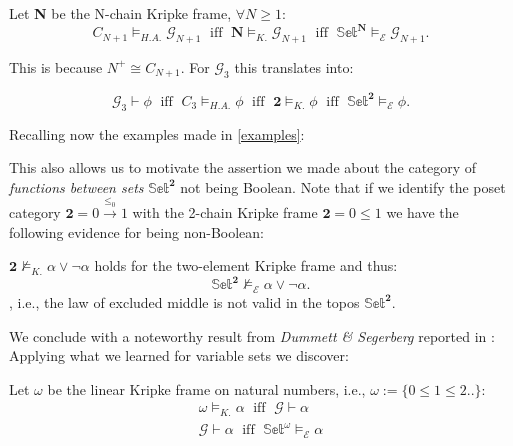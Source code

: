 \begin{prop}
	Let \textbf{N} be the N-chain Kripke frame,
	$\forall N \geq 1$:
	\begin{equation*}
		C_{N+1} \models_{H.A.} \mathcal{G}_{N+1} \; \text{ iff } \; \textbf{N} \models_{K.} \mathcal{G}_{N+1}
		\; \text{ iff } \; \mathbb{Set}^\textbf{N} \models_{\mathcal{E}} \mathcal{G}_{N+1}.
	\end{equation*}
\end{prop}

 This is because $N^+ \cong C_{N+1}$.
\newline
For $\mathcal{G}_3$ this translates into:
\begin{cor}
	\begin{equation*}
		\mathcal{G}_3 \vdash \phi\; \text{ iff } \; C_{3} \models_{H.A.} \phi \; \text{ iff } \; \textbf{2} \models_{K.} \phi
		\; \text{ iff } \; \mathbb{Set}^\textbf{2} \models_{\mathcal{E}} \phi.
	\end{equation*}
\end{cor}


Recalling now the examples made in \ref{examples}: \newline

This also allows us to motivate the assertion we made about the category of \emph{functions between sets}  $\mathbb{Set}^{\textbf{2}}$ not being Boolean. \newline
Note that if we identify the poset category $\textbf{2}=0 \xrightarrow{\leq_0} 1$ with the 2-chain Kripke frame $\textbf{2}=0 \leq 1 $ we have the following evidence for being non-Boolean:

\begin{prop}
	$ \textbf{2} \not\models_{K.} \alpha \lor \neg \alpha $ holds for the two-element Kripke frame and thus:
	\begin{equation*}
		\mathbb{Set}^\textbf{2} \not\models_{\mathcal{E}} \alpha \lor \neg \alpha.
	\end{equation*} 
	, i.e., the law of excluded middle is not valid in the topos $ \mathbb{Set}^\textbf{2}$.
\end{prop}

\newpage
We conclude with a noteworthy result from \emph{Dummett \& Segerberg} reported in \cite{goldblatt}:\newline
	Applying what we learned for variable sets we discover:

\begin{prop}
	Let $\omega$ be the linear Kripke frame on natural numbers, i.e., $\omega := \{0 \leq 1 \leq 2..\}$:
	\begin{gather*}
		\omega \models_{K.} \alpha \; \text{ iff } \; \mathcal{G} \vdash \alpha \\
		\mathcal{G} \vdash \alpha \; \text{ iff } \;   \mathbb{Set}^\omega \models_{\mathcal{E}} \alpha 
	\end{gather*}
\end{prop}

